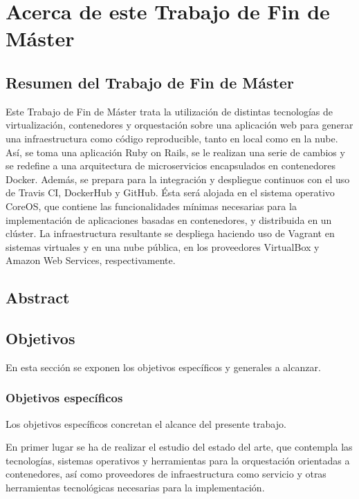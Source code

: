 \chapter{Acerca de este Trabajo de Fin de Máster}
\label{cha:introduction}

\section{Resumen del Trabajo de Fin de Máster}

Este Trabajo de Fin de Máster trata la utilización de distintas tecnologías de virtualización, contenedores y orquestación sobre una aplicación web para generar una infraestructura como código reproducible, tanto en local como en la nube. Así, se toma una aplicación Ruby on Rails, se le realizan una serie de cambios y se redefine a una arquitectura de microservicios encapsulados en contenedores Docker. Además, se prepara para la integración y despliegue continuos con el uso de Travis CI, DockerHub y GitHub. Ésta será alojada en el sistema operativo CoreOS, que contiene las funcionalidades mínimas necesarias para la implementación de aplicaciones basadas en contenedores, y distribuida en un clúster. La infraestructura resultante se despliega haciendo uso de Vagrant en sistemas virtuales y en una nube pública, en los proveedores VirtualBox y Amazon Web Services, respectivamente. 

\section{Abstract}

\section{Objetivos}

En esta sección se exponen los objetivos específicos y generales a alcanzar.

\subsection{Objetivos específicos}

Los objetivos específicos concretan el alcance del presente trabajo.

En primer lugar se ha de realizar el estudio del estado del arte, que contempla las tecnologías, sistemas operativos y herramientas para la orquestación orientadas a contenedores, así como proveedores de infraestructura como servicio y otras herramientas tecnológicas necesarias para la implementación. 

